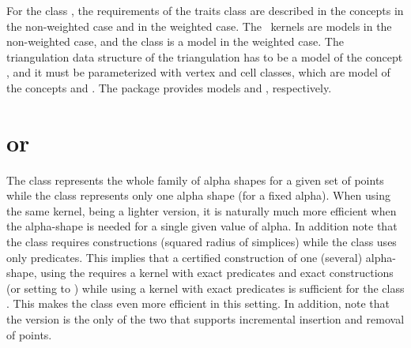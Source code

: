 For the class , the requirements of
the traits class are described in the concepts 
in the non-weighted case and  in the weighted case.
The \cgal\ kernels are models in the non-weighted case, and 
the class  is a model
in the weighted case.
The triangulation data structure of the triangulation
has to be a model of the concept ,
and it must be parameterized with vertex and cell classes, which are model of the concepts
 and .
The package provides models  
and , respectively.



\section{\texorpdfstring{ or }{Alpha\textunderscore{}shape\textunderscore{}3 or Fixed\textunderscore{}alpha\textunderscore{}shape\textunderscore{}3}}

The class  represents the whole family
of alpha shapes for a given set of points while the class 
represents only one alpha shape (for a fixed alpha). When using the same kernel,
 being a lighter version, it is naturally much more efficient 
when the alpha-shape is needed for a single given value of alpha.
In addition note that the class 
requires constructions (squared radius of simplices) while the 
class  uses only predicates.
This implies that a certified construction of one (several)
alpha-shape, using the  requires a kernel
with exact predicates and exact constructions (or setting  to )
while using a kernel with exact predicates is sufficient for the class .
This makes the class  even more efficient in this setting.
In addition, note that the  version is the only of the
two that supports incremental insertion and removal of points.

